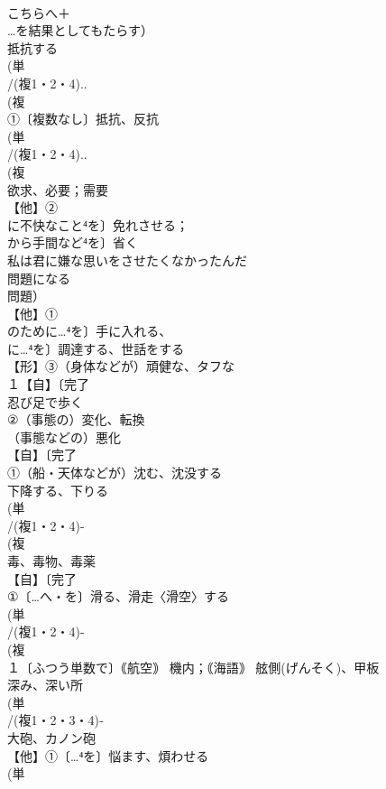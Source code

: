 \documentclass[8pt]{extreport}
\begin{document}
\begin{CJK}{UTF8}{min}
\\	こちらへ＋
\\	…を結果としてもたらす）
\\	抵抗する
\\	(単
\\	/(複1・2・4)..
\\	(複
\\	①〔複数なし〕抵抗、反抗 
\\	(単
\\	/(複1・2・4)..
\\	(複
\\	欲求、必要；需要 
\\	【他】②
\\	に不快なこと⁴を〕免れさせる；
\\	から手間など⁴を〕省く 
\\	私は君に嫌な思いをさせたくなかったんだ 
\\	問題になる 
\\	問題）
\\	【他】①
\\	のために…⁴を〕手に入れる、
\\	に…⁴を〕調達する、世話をする 
\\	【形】③（身体などが）頑健な、タフな
\\	１【自】〔完了
\\	忍び足で歩く 
\\	②（事態の）変化、転換 
\\	（事態などの）悪化
\\	【自】〔完了
\\	①（船・天体などが）沈む、沈没する 
\\	下降する、下りる 
\\	(単
\\	/(複1・2・4)-
\\	(複
\\	毒、毒物、毒薬 
\\	【自】〔完了
\\	①〔…へ・を〕滑る、滑走〈滑空〉する 
\\	(単
\\	/(複1・2・4)-
\\	(複
\\	１〔ふつう単数で〕｟航空｠ 機内；｟海語｠ 舷側(げんそく)、甲板 
\\	深み、深い所 
\\	(単
\\	/(複1・2・3・4)‐
\\	大砲、カノン砲 
\\	【他】①〔…⁴を〕悩ます、煩わせる 
\\	(単

\end{CJK}
\end{document}
